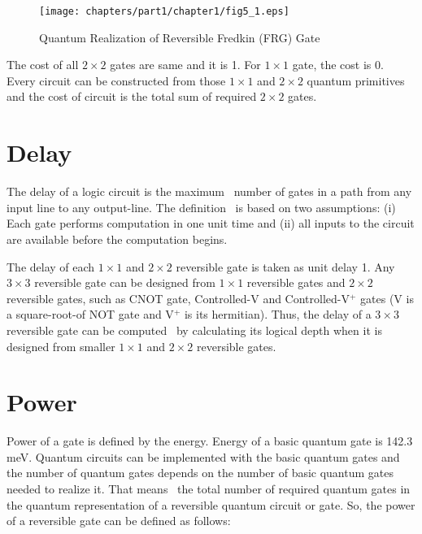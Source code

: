 \begin{figure}[H]
\centering
\texttt{[image: chapters/part1/chapter1/fig5\_1.eps]}
\caption{Quantum Realization of Reversible Fredkin (FRG) Gate}
\label{fig:p1_c1_fig5_1}
\end{figure}
\begin{example}\textnormal{
The cost of all $2 \times 2$ gates are same and it is 1. For $1 \times 1$ gate, the cost is 0. Every circuit can be constructed from those $1 \times 1$ and $2 \times 2$ quantum primitives and the cost of circuit is the total sum of required $2 \times 2$ gates.}
\end{example}
\section{Delay}
The delay of a logic circuit is the maximum~ number of gates in a path from any input line to any output-line. The definition~ is based on two assumptions: (i) Each gate performs computation in one unit time and (ii) all inputs to the circuit are available before the computation begins.


\begin{example}\textnormal{
The delay of each $1 \times 1$ and $2 \times 2$ reversible gate is taken as unit delay 1. Any $3 \times 3$ reversible gate can be designed from $1 \times 1$ reversible gates and $2\times 2$ reversible gates, such as CNOT gate, Controlled-V and Controlled-V$^+$ gates (V is a square-root-of NOT gate and V$^+$ is its hermitian). Thus, the delay of a $3 \times 3$ reversible gate can be computed~ by calculating its logical depth when it is designed from smaller $1 \times 1$ and $2 \times 2$ reversible gates.}
\end{example}

\section{Power}
Power of a gate is defined by the energy. Energy of a basic quantum gate is 142.3 meV. Quantum circuits can be implemented with the basic quantum gates and the number of quantum gates depends on the number of basic quantum gates needed to realize it. That means~ the total number of required quantum gates in the quantum representation of a reversible quantum circuit or gate. So, the power of a reversible gate can be defined as follows:


